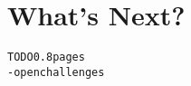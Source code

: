 \section{What's Next?}\label{sec:whatsnext}

\begin{alltt}TODO\scriptsize 0.8 pages
- open challenges
\end{alltt}
